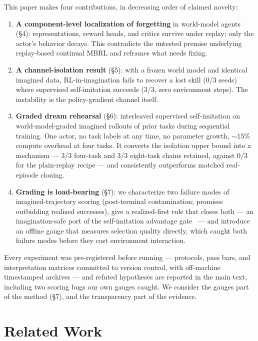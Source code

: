 \documentclass[10pt]{article}
\providecommand{\tightlist}{\setlength{\itemsep}{0pt}\setlength{\parskip}{0pt}}
\begin{document}
This paper makes four contributions, in decreasing order of claimed novelty:
\begin{enumerate}\tightlist
\item \textbf{A component-level localization of forgetting} in world-model agents (\S4):
representations, reward heads, and critics survive under replay; only the actor's behavior
decays. This contradicts the untested premise underlying replay-based continual MBRL and
reframes what needs fixing.
\item \textbf{A channel-isolation result} (\S5): with a frozen world model and identical
imagined data, RL-in-imagination fails to recover a lost skill (0/3 seeds) where supervised
self-imitation succeeds (3/3, zero environment steps). The instability is the
policy-gradient channel itself.
\item \textbf{Graded dream rehearsal} (\S6): interleaved supervised self-imitation on
world-model-graded imagined rollouts of prior tasks during sequential training. One actor,
no task labels at any time, no parameter growth, ${\sim}15\%$ compute overhead at four
tasks. It converts the isolation upper bound into a mechanism --- 3/3 four-task and 3/3
eight-task chains retained, against 0/3 for the plain-replay recipe --- and consistently
outperforms matched real-episode cloning.
\item \textbf{Grading is load-bearing} (\S7): we characterize two failure modes of
imagined-trajectory scoring (post-terminal contamination; promises outbidding realized
successes), give a realized-first rule that closes both --- an imagination-safe port of the
self-imitation advantage gate~\cite{oh2018self} --- and introduce an offline gauge that
measures selection quality directly, which caught both failure modes before they cost
environment interaction.
\end{enumerate}

Every experiment was pre-registered before running --- protocols, pass bars, and
interpretation matrices committed to version control, with off-machine timestamped archives
--- and refuted hypotheses are reported in the main text, including two scoring bugs our own
gauges caught. We consider the gauges part of the method (\S7), and the transparency part of
the evidence.

\section{Related Work}
\end{document}
